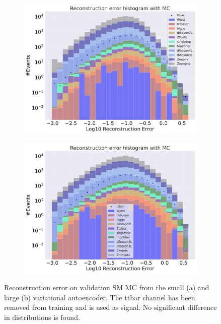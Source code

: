 \begin{figure}[!htb]
    \centering
    \begin{subfigure}{.45\textwidth}
        \includegraphics[width=\textwidth]{Figures/VAE_testing/small/b_data_recon_big_rm3_feats_sig_ttbar.pdf}
        \caption{}
        \label{fig:vae_small_ttbar}
    \end{subfigure}
    \hfill 
    \begin{subfigure}{.45\textwidth}
        \includegraphics[width=\textwidth]{Figures/VAE_testing/big/b_data_recon_big_rm3_feats_sig_ttbar.pdf}
        \caption{ }
        \label{fig:vae_big_ttbar}
    \end{subfigure}
    \hfill 
    \caption[VAE | Reconstruction error using ttbar channel as signal]{Reconstruction error on validation SM MC from the small (a) and large (b) variational autoencoder. The ttbar channel has been removed from training and 
    is used as signal. No significant difference in distributions is found.  }
    \label{fig:vae_big_channel_3}
\end{figure} 
